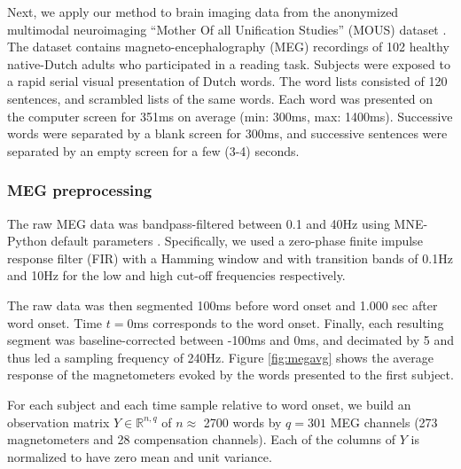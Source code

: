 
Next, we apply our method to brain imaging data from the anonymized multimodal
neuroimaging ``Mother Of all Unification Studies'' (MOUS) dataset
\citep{schoffelen2019204}. The dataset contains magneto-encephalography (MEG)
recordings of 102 healthy native-Dutch adults who participated in a reading
task.
%
Subjects were exposed to a rapid serial visual presentation of Dutch words. The
word lists consisted of 120 sentences, and scrambled lists of the same words.
Each word was presented on the computer screen for 351ms on average (min: 300ms,
max: 1400ms). Successive words were separated by a blank screen for 300ms, and
successive sentences were separated by an empty screen for a few (3-4) seconds.

\subsubsection{MEG preprocessing}

The raw MEG data was bandpass-filtered between 0.1 and 40Hz using MNE-Python
default parameters \citep{gramfort2013meg, gramfort2014mne}. Specifically, we used a zero-phase finite impulse
response filter (FIR) with a Hamming window and with transition bands of 0.1Hz
and 10Hz for the low and high cut-off frequencies respectively.

The raw data was then segmented 100ms before word onset and 1.000 sec after
word onset. Time $t=0$ms corresponds to the word onset. Finally, each resulting
segment was baseline-corrected between -100ms and 0ms, and decimated by 5 and
thus led a sampling frequency of 240Hz. Figure \ref{fig:megavg} shows
the average response of the magnetometers evoked by the words presented to the
first subject.

For each subject and each time sample relative to word onset, we
build an observation matrix $Y \in \mathbb{R}^{n, q}$ of $n\approx$ 2700 words
by $q=301$ MEG channels (273 magnetometers and 28 compensation channels). Each
of the columns of $Y$ is normalized to have zero mean and unit variance.

